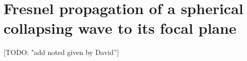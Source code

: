 \documentclass{iucr}              %
\newcommand{\todo}[1]{{\color{red}[TODO: "#1'']}}
\begin{document}
\section{Fresnel propagation of a spherical collapsing wave to its focal plane}
\todo{add noted given by David}








%

% 
% 
% 
% 
\end{document}
